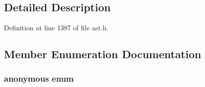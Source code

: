 \subsection{Detailed Description}


Definition at line 1387 of file ast.h.



\subsection{Member Enumeration Documentation}
\hypertarget{classmocha_1_1_unary_exp_a621ac6867fcae6e66ea6111eff70cdb0}{
\subsubsection[{"@9}]{\setlength{\rightskip}{0pt plus 5cm}anonymous enum}}
\label{classmocha_1_1_unary_exp_a621ac6867fcae6e66ea6111eff70cdb0}
